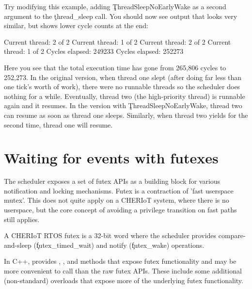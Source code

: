 Try modifying this example, adding \c{ThreadSleepNoEarlyWake}  as a second argument to the \c{thread_sleep} call.
You should now see output that looks very similar, but shows lower cycle counts at the end:

\begin{console}
Current thread: 2 of 2
Current thread: 1 of 2
Current thread: 2 of 2
Current thread: 1 of 2
Cycles elapsed: 249233
Cycles elapsed: 252273
\end{console}

Here you see that the total execution time has gone from 265,806 cycles to 252,273.
In the original version, when thread one slept (after doing far less than one tick's worth of work), there were no runnable threads so the scheduler does nothing for a while.
Eventually, thread two (the high-priority thread) is runnable again and it resumes.
In the version with \c{ThreadSleepNoEarlyWake}, thread two can resume as soon as thread one sleeps.
Similarly, when thread two yields for the second time, thread one will resume.

\section[label=futex]{Waiting for events with futexes}

The scheduler exposes a set of futex APIs as a building block for various notification and locking mechanisms.
Futex is a contraction of 'fast userspace mutex'.
This does not quite apply on a CHERIoT system, where there is no userspace, but the core concept of avoiding a privilege transition on fast paths still applies.

A CHERIoT RTOS futex is a 32-bit word where the scheduler provides compare-and-sleep (\c{futex_timed_wait}) and notify (\c{futex_wake}) operations.



\begin{note}
	In C++,  provides , , and  methods that expose futex functionality and may be more convenient to call than the raw futex APIs.
	These include some additional (non-standard) overloads that expose more of the underlying futex functionality.
\end{note}

